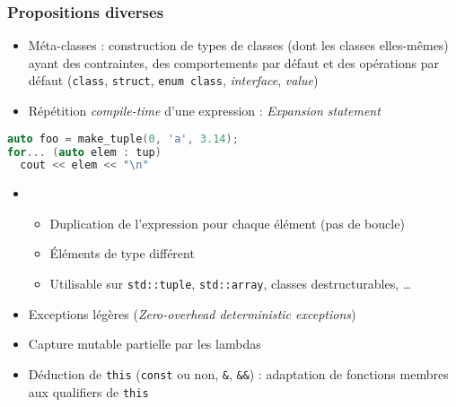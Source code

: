 \documentclass[C++.tex]{subfiles}
\begin{document}
\begin{frame}[fragile]
	\frametitle{Propositions diverses}
	\begin{itemize}
		\item Méta-classes : construction de types de classes (dont les classes elles-mêmes) ayant des contraintes, des comportements par défaut et des opérations par défaut (\lstinline|class|, \lstinline|struct|, \lstinline|enum class|, \textit{interface}, \textit{value})
		\item Répétition \textit{compile-time} d'une expression : \textit{Expansion statement}
	\end{itemize}
		
	\begin{lstlisting}[language=C++]
auto foo = make_tuple(0, 'a', 3.14);
for... (auto elem : tup)  
  cout << elem << "\n"\end{lstlisting}
			
	\begin{itemize}
		\item [] \begin{itemize}
			\item Duplication de l'expression pour chaque élément (pas de boucle)
			\item Éléments de type différent
			\item Utilisable sur \lstinline|std::tuple|, \lstinline|std::array|, classes destructurables, \ldots
		\end{itemize}
		\item Exceptions légères (\textit{Zero-overhead deterministic exceptions})
		\item Capture mutable partielle par les lambdas


		\item Déduction de \lstinline|this| (\lstinline|const| ou non, \lstinline|&|, \lstinline|&&|) : adaptation de fonctions membres aux qualifiers de \lstinline|this|


	\end{itemize}
\end{frame}
\end{document}
